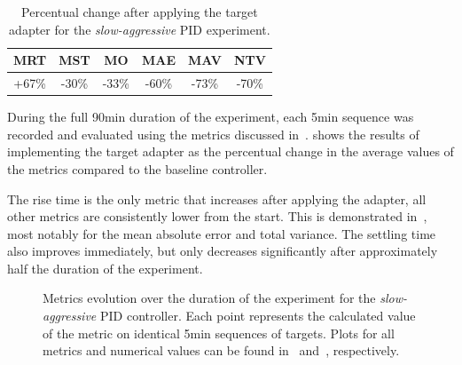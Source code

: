 \begin{table}[t]
    \centering
    \caption{Percentual change after applying the target adapter for the \emph{slow-aggressive} PID experiment.}
    \label{tab:slow-overhoot-percent}
    \begin{tabular}{cccccc}
        \toprule
        MRT              & MST             & MO              & MAE              & MAV              & NTV              \\
        \midrule
        +67\si{\percent} & -30\si{\percent} & -33\si{\percent} & -60\si{\percent} & -73\si{\percent}  & -70\si{\percent}\\
        \bottomrule
    \end{tabular}
\end{table}

During the full 90\si{\minute} duration of the experiment, each 5\si{\minute} sequence was recorded and evaluated using the metrics discussed in~.
 shows the results of implementing the target adapter as the percentual change in the average values of the metrics compared to the baseline controller.


The rise time is the only metric that increases after applying the adapter, all other metrics are consistently lower from the start.
This is demonstrated in~, most notably for the mean absolute error and total variance.
The settling time also improves immediately, but only decreases significantly after approximately half the duration of the experiment.

\begin{figure}[!t]
    \centering
    
    \vspace*{-1em}
    \caption{Metrics evolution over the duration of the experiment for the \emph{slow-aggressive} PID controller. Each point represents the calculated value of the metric on identical 5\si{\minute} sequences of targets. Plots for all metrics and numerical values can be found in~ and~, respectively.}
    \label{fig:slow-overshoot-metrics}
\end{figure}


